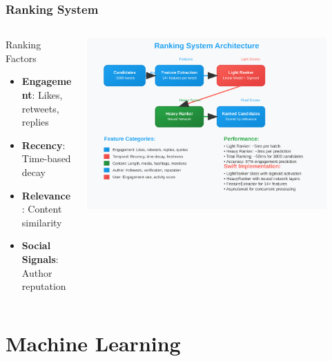 \documentclass[aspectratio=169]{beamer}
\begin{document}
\begin{frame}
    \frametitle{Ranking System}
    \begin{columns}
        \begin{column}{0.5\textwidth}
            \begin{block}{Ranking Factors}
                \begin{itemize}
                    \item \textbf{Engagement}: Likes, retweets, replies
                    \item \textbf{Recency}: Time-based decay
                    \item \textbf{Relevance}: Content similarity
                    \item \textbf{Social Signals}: Author reputation
                \end{itemize}
            \end{block}
        \end{column}
        \begin{column}{0.5\textwidth}
            \begin{center}
                \includegraphics[width=0.9\textwidth]{images/ranking-system.svg}
            \end{center}
        \end{column}
    \end{columns}
\end{frame}

\section{Machine Learning}
\end{document}
